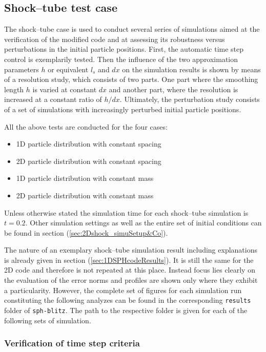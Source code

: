\documentclass[11pt,a4paper,twoside]{report}
\begin{document}
\subsection{Shock--tube test case}
\label{sec:2DSPHcodeResults_Shock}
The shock--tube case is used to conduct several series of simulations aimed at the verification of the modified code and at assessing %
its robustness versus perturbations in the initial particle positions. 
First, the automatic time step control is exemplarily tested. Then the influence of the two approximation parameters $h$ or equivalent $l_s$ and $dx$ on the simulation results is shown by means of a resolution study, which consists of two parts. One part where the smoothing length $h$ is varied at constant $dx$ and another part, where the resolution is increased at a constant ratio of $h/dx$. Ultimately, the perturbation study consists of a set of simulations with increasingly perturbed initial particle positions.

All the above tests are conducted for the four cases:
\begin{itemize}
 \item 1D particle distribution with constant spacing
  \item 2D particle distribution with constant spacing
 \item 1D particle distribution with constant mass
  \item 2D particle distribution with constant mass
\end{itemize}

Unless otherwise stated the simulation time for each shock--tube simulation is $t=0.2$. Other simulation settings as well as the entire set of initial conditions can be found in section (\ref{sec:2Dshock_simuSetup&Co}).

The nature of an exemplary shock--tube simulation result including explanations is already given in section (\ref{sec:1DSPHcodeResults}). It is still the same for the 2D code and therefore is not repeated at this place. Instead focus lies clearly on the evaluation of the error norms and profiles are shown only where they exhibit a particularity. However, the complete set of figures for each simulation run constituting the following analyzes can be found in the corresponding {\tt results} folder of {\tt sph-blitz}. The path to the respective folder is given for each of the following sets of simulation.

\subsubsection{Verification of time step criteria}
\end{document}
